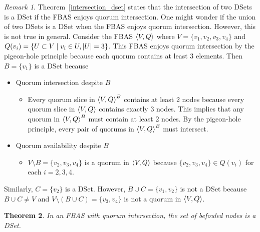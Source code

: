 \documentclass[12pt, psamsfonts]{amsart}
\newtheorem{thm}{Theorem}[subsection]
\theoremstyle{definition}
\theoremstyle{remark}
\newtheorem{rem}[thm]{Remark}
\numberwithin{equation}{subsection}
\begin{document}
\begin{rem}
    Theorem~\ref{intersection_dset} states that the intersection of two DSets is a DSet if the FBAS enjoys quorum intersection.
    One might wonder if the union of two DSets is a DSet when the FBAS enjoys quorum intersection.
    However, this is not true in general.
    Consider the FBAS $\ev{V, Q}$ where $V = \{ v_1, v_2, v_3, v_4 \}$ and $Q(v_i) = \{ U \subset V \mid v_i \in U, \abs{U} = 3 \}$.
    This FBAS enjoys quorum intersection by the pigeon-hole principle because each quorum contains at least 3 elements.
    Then $B = \{ v_1 \}$ is a DSet because
    \begin{itemize}
        \item
            Quorum intersection despite $B$
            \begin{itemize}
                \item
                    Every quorum slice in $\ev{V, Q}^B$ contains at least 2 nodes because every quorum slice in $\ev{V, Q}$ contains exactly 3 nodes.
                    This implies that any quorum in $\ev{V, Q}^B$ must contain at least 2 nodes.
                    By the pigeon-hole principle, every pair of quorums in $\ev{V, Q}^B$ must intersect.
            \end{itemize}
        \item
            Quorum availability despite $B$
            \begin{itemize}
                \item
                    $V \setminus B = \{ v_2, v_3, v_4 \}$ is a quorum in $\ev{V, Q}$ because $\{ v_2, v_3, v_4 \} \in Q(v_i)$ for each $i = 2, 3, 4$.
            \end{itemize}
    \end{itemize}
    Similarly, $C = \{ v_2 \}$ is a DSet.
    However, $B \cup C = \{ v_1, v_2 \}$ is not a DSet because $B \cup C \ne V$ and $V \setminus (B \cup C) = \{ v_3, v_4 \}$ is not a quorum in $\ev{V, Q}$.
\end{rem}

\begin{thm}\label{befouled_dset}
	In an FBAS with quorum intersection, the set of befouled nodes is a DSet.
\end{thm}
\end{document}
